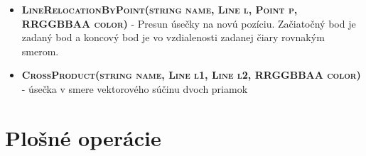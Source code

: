 \begin{itemize}
\item \textsc{\textbf{LineRelocationByPoint(string name, Line l, Point p, RRGGBBAA color)}} - Presun úsečky na novú pozíciu. Začiatočný bod je zadaný bod a koncový bod je vo vzdialenosti zadanej čiary rovnakým smerom.%
\item \textsc{\textbf{CrossProduct(string name, Line l1, Line l2, RRGGBBAA color)}} - úsečka v smere vektorového súčinu dvoch priamok%

\end{itemize}




\section*{Plošné operácie}

